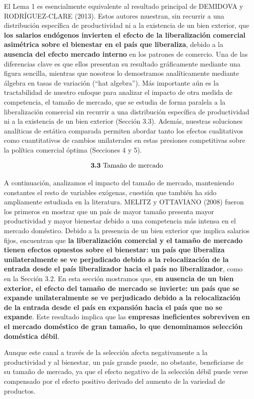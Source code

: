 \documentclass[10pt,a4paper]{article}
\begin{document}
El Lema 1 es esencialmente equivalente al resultado principal de DEMIDOVA y RODRÍGUEZ-CLARE (2013). Estos autores muestran, sin recurrir a una distribución específica de productividad ni a la existencia de un bien exterior, que \textbf{los salarios endógenos invierten el efecto de la liberalización comercial asimétrica sobre el bienestar en el país que liberaliza}, debido a la \textbf{ausencia del efecto mercado interno} en los patrones de comercio. Una de las diferencias clave es que ellos presentan su resultado gráficamente mediante una figura sencilla, mientras que nosotros lo demostramos analíticamente mediante álgebra en tasas de variación (“hat algebra”). Más importante aún es la tractabilidad de nuestro enfoque para analizar el impacto de otra medida de competencia, el tamaño de mercado, que se estudia de forma paralela a la liberalización comercial sin recurrir a una distribución específica de productividad ni a la existencia de un bien exterior (Sección 3.3). Además, nuestras soluciones analíticas de estática comparada permiten abordar tanto los efectos cualitativos como cuantitativos de cambios unilaterales en estas presiones competitivas sobre la política comercial óptima (Secciones 4 y 5).

$$\text{\textbf{3.3} Tamaño de mercado}$$

A continuación, analizamos el impacto del tamaño de mercado, manteniendo constantes el resto de variables exógenas, cuestión que también ha sido ampliamente estudiada en la literatura. MELITZ y OTTAVIANO (2008) fueron los primeros en mostrar que un país de mayor tamaño presenta mayor productividad y mayor bienestar debido a una competencia más intensa en el mercado doméstico. Debido a la presencia de un bien exterior que implica salarios fijos, encuentran que \textbf{la liberalización comercial y el tamaño de mercado tienen efectos opuestos sobre el bienestar: un país que liberaliza unilateralmente se ve perjudicado debido a la relocalización de la entrada desde el país liberalizador hacia el país no liberalizador}, como en la Sección 3.2. En esta sección mostramos que, \textbf{en ausencia de un bien exterior, el efecto del tamaño de mercado se invierte: un país que se expande unilateralmente se ve perjudicado debido a la relocalización de la entrada desde el país en expansión hacia el país que no se expande}. Este resultado implica que las \textbf{empresas ineficientes sobreviven en el mercado doméstico de gran tamaño, lo que denominamos selección doméstica débil}. 

Aunque este canal a través de la selección afecta negativamente a la productividad y al bienestar, un país grande puede, no obstante, beneficiarse de su tamaño de mercado, ya que el efecto negativo de la selección débil puede verse compensado por el efecto positivo derivado del aumento de la variedad de productos.
\end{document}
